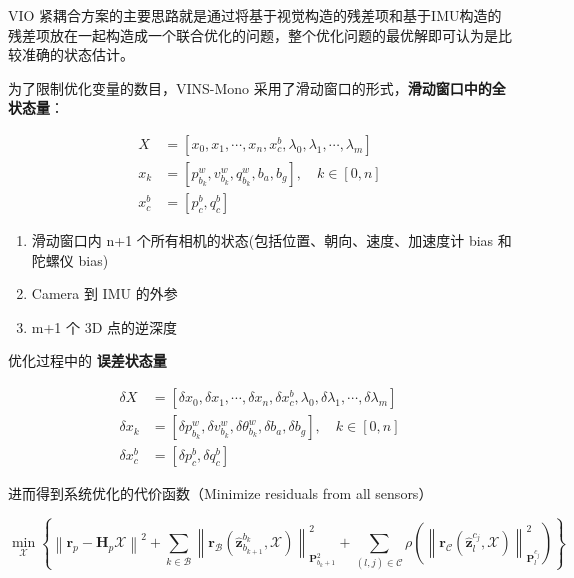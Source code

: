 \documentclass[12pt,a4paper]{article}
\begin{document}
VIO 紧耦合方案的主要思路就是通过将基于视觉构造的残差项和基于IMU构造的残差项放在一起构造成一个联合优化的问题，整个优化问题的最优解即可认为是比较准确的状态估计。

为了限制优化变量的数目，VINS-Mono 采用了滑动窗口的形式，\textbf{滑动窗口中的全状态量}：

\begin{equation}
\begin{aligned}
X &= [x_{0},x_{1},\cdots ,x_{n},x^{b}_{c},{\lambda}_{0},{\lambda}_{1}, \cdots ,{\lambda}_{m}]  \\
x_{k} &= [p^{w}_{b_{k}},v^{w}_{b_{k}},q^{w}_{b_{k}},b_{a},b_{g}],\quad k\in[0,n] \\
x^{b}_{c} &= [p^{b}_{c},q^{b}_{c}]
\end{aligned}
\end{equation}

\begin{enumerate}
\item 滑动窗口内 n+1 个所有相机的状态(包括位置、朝向、速度、加速度计 bias 和陀螺仪 bias)
\item Camera 到 IMU 的外参
\item m+1 个 3D 点的逆深度
\end{enumerate}

优化过程中的 \textbf{误差状态量}

\begin{equation}
\begin{aligned}
\delta X&=[\delta x_{0},\delta x_{1},\cdots ,\delta x_{n},\delta x^{b}_{c},\lambda_{0},\delta \lambda _{1}, \cdots , \delta \lambda_{m}]  \\
\delta x_{k}&=[\delta p^{w}_{b_{k}},\delta v^{w}_{b_{k}},\delta \theta ^{w}_{b_{k}},\delta b_{a},\delta b_{g}],\quad k\in[0,n] \\
\delta x^{b}_{c}&= [\delta p^{b}_{c},\delta q^{b}_{c}]
\end{aligned}
\end{equation}

进而得到系统优化的代价函数（Minimize residuals from all sensors）

\begin{equation}
\min _{\mathcal{X}}
\left\{\left\|\mathbf{r}_{p}-\mathbf{H}_{p} \mathcal{X}\right\|^{2}+\sum_{k \in \mathcal{B}}\left\|\mathbf{r}_{\mathcal{B}}\left(\hat{\mathbf{z}}_{b_{k+1}}^{b_{k}}, \mathcal{X}\right)\right\|_{\mathbf{P}_{b_{k}+1}^{2}}^{2}+\sum_{(l, j) \in \mathcal{C}} \rho\left(\left\|\mathbf{r}_{\mathcal{C}}\left(\hat{\mathbf{z}}_{l}^{c_{j}}, \mathcal{X}\right)\right\|_{\mathbf{P}_{l}^{c_{j}}}^{2}
\right)\right\}
\end{equation}
\end{document}

